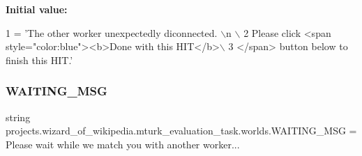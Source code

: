{\bfseries Initial value\+:}
\begin{DoxyCode}
1 =  \textcolor{stringliteral}{'The other worker unexpectedly diconnected. \(\backslash\)n \(\backslash\)}
2 \textcolor{stringliteral}{        Please click <span style="color:blue"><b>Done with this HIT</b>\(\backslash\)}
3 \textcolor{stringliteral}{        </span> button below to finish this HIT.'}
\end{DoxyCode}
\mbox{\label{namespaceprojects_1_1wizard__of__wikipedia_1_1mturk__evaluation__task_1_1worlds_a109ecb7db563e23a03f5a213fd96e849}} 
\subsubsection{\texorpdfstring{W\+A\+I\+T\+I\+N\+G\+\_\+\+M\+SG}{WAITING\_MSG}}
{\footnotesize\ttfamily string projects.\+wizard\+\_\+of\+\_\+wikipedia.\+mturk\+\_\+evaluation\+\_\+task.\+worlds.\+W\+A\+I\+T\+I\+N\+G\+\_\+\+M\+SG = \textquotesingle{}Please wait while we match you with another worker...\textquotesingle{}}

